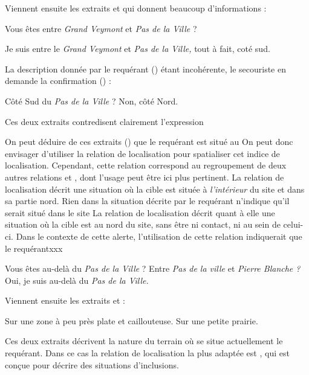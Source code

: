 Viennent ensuite les extraits  et  qui donnent beaucoup
d'informations :
%
\begin{dialogue}
  \Sec {} Vous êtes entre \emph{Grand Veymont} et \emph{Pas de
la Ville} ?

  \Req {} Je suis entre le \emph{Grand Veymont} et \emph{Pas de la
Ville,} tout à fait,  coté sud.
\end{dialogue}
%

La description donnée par le requérant () étant
incohérente, le secouriste en demande la confirmation () :
%
\begin{dialogue}
  \Sec {} Côté Sud du \emph{Pas de la Ville} ?
%
  \Req {} Non, côté Nord.
\end{dialogue}
%
Ces deux extraits contredisent clairement l'expression 

On peut déduire de ces extraits () que le requérant
est situé au
%
On peut donc envisager d'utiliser la relation de localisation
 pour spatialiser cet indice de
localisation. Cependant, cette relation correspond au regroupement de
deux autres relations  et
, dont l'usage peut être ici plus
pertinent.
%
La relation de localisation 
décrit une situation où la cible est située à \emph{l'intérieur} du
site et dans sa partie nord.
%
Rien dans la situation décrite par le requérant n'indique qu'il serait
situé dans le site
%
La relation de localisation  décrit
quant à elle une situation où la cible est au nord du site, sans être
ni contact, ni au sein de celui-ci.
%
Dans le contexte de cette alerte, l'utilisation de cette relation
indiquerait que le requérantxxx





\begin{dialogue}
  \Sec {} Vous êtes au-delà du \emph{Pas de la Ville} ?
   Entre \emph{Pas de la ville} et \emph{Pierre Blanche ?}
  \Req {} Oui, je suis au-delà du \emph{Pas de la Ville.}
\end{dialogue}
%



Viennent ensuite les extraits  et  :
%
\begin{dialogue}
  \Req {} Sur une zone à peu près plate et
  caillouteuse.  Sur une petite prairie.
\end{dialogue}
%
Ces deux extraits décrivent la nature du terrain où se situe
actuellement le requérant. Dans ce cas la relation de localisation la
plus adaptée est , qui est conçue pour
décrire des situations d'inclusions.


